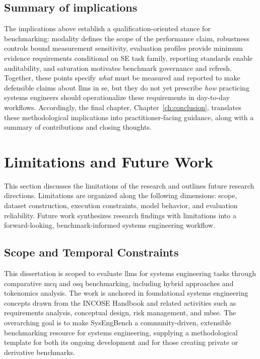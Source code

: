 \subsection{Summary of implications}
\label{subsec:ch5_imp_summary}

The implications above establish a qualification-oriented stance for benchmarking: modality defines the scope of the performance claim, robustness controls bound measurement sensitivity, evaluation profiles provide minimum evidence requirements conditional on SE task family, reporting standards enable auditability, and saturation motivates benchmark governance and refresh. Together, these points specify \emph{what} must be measured and reported to make defensible claims about \acp{llm} in \ac{se}, but they do not yet prescribe \emph{how} practicing systems engineers should operationalize these requirements in day-to-day workflows. Accordingly, the final chapter, Chapter~\ref{ch:conclusion}, translates these methodological implications into practitioner-facing guidance, along with a summary of contributions and closing thoughts.

\section{Limitations and Future Work}\label{sec:limits_and_future_work}

This section discusses the limitations of the research and outlines future research directions. Limitations are organized along the following dimensions: scope, dataset construction, execution constraints, model behavior, and evaluation reliability. Future work synthesizes research findings with limitations into a forward-looking, benchmark-informed systems engineering workflow.

\subsection{Scope and Temporal Constraints}

This dissertation is scoped to evaluate \acp{llm} for systems engineering tasks through comparative \ac{mcq} and \ac{osq} benchmarking, including hybrid approaches and tokenomics analysis. The work is anchored in foundational systems engineering concepts drawn from the INCOSE Handbook and related activities such as requirements analysis, conceptual design, risk management, and \ac{mbse}. The overarching goal is to make SysEngBench a community-driven, extensible benchmarking resource for systems engineering, supplying a methodological template for both its ongoing development and for those creating private or derivative benchmarks.


